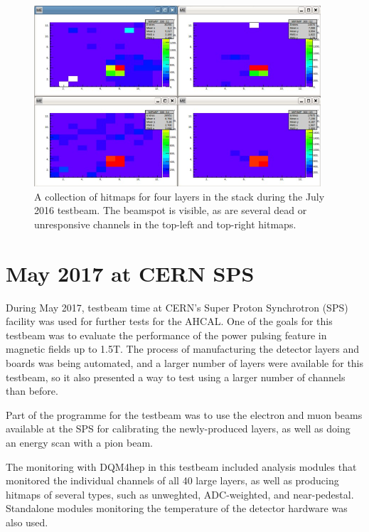 \begin{figure}[p]
	\centering
	\includegraphics[width=0.95\textwidth]{../Pictures/AHCALHitmapFour.png}
	\caption{A collection of hitmaps for four layers in the stack during the July 2016 testbeam. The beamspot is visible, as are several dead or unresponsive channels in the top-left and top-right hitmaps.}
	\label{figure:aida/july2016/four-hitmap}
\end{figure}


\section{May 2017 at CERN SPS} %
During May 2017, testbeam time at CERN's Super Proton Synchrotron (SPS) facility was used for further tests for the AHCAL. One of the goals for this testbeam was to evaluate the performance of the power pulsing feature in magnetic fields up to 1.5T. The process of manufacturing the detector layers and boards was being automated, and a larger number of layers were available for this testbeam, so it also presented a way to test using a larger number of channels than before. 

Part of the programme for the testbeam was to use the electron and muon beams available at the SPS for calibrating the newly-produced layers, as well as doing an energy scan with a pion beam.

The monitoring with DQM4hep in this testbeam included analysis modules that monitored the individual channels of all 40 large layers, as well as producing hitmaps of several types, such as unweghted, ADC-weighted, and near-pedestal. Standalone modules monitoring the temperature of the detector hardware was also used. 

